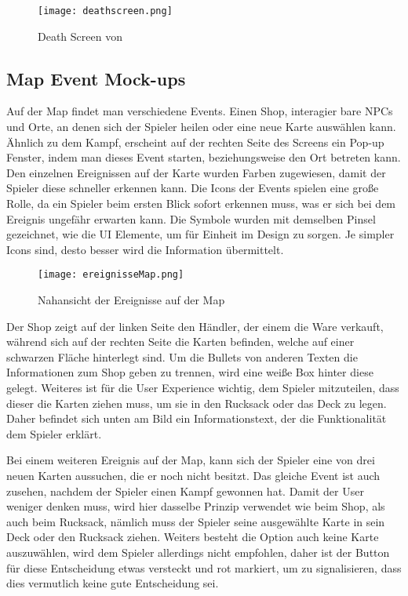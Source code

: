 \begin{figure}[H]
    \centering
    \texttt{[image: deathscreen.png]}
    \caption{Death Screen von \FF}
\end{figure}

\subsection{Map Event Mock-ups}

Auf der Map findet man verschiedene Events. Einen Shop, interagier bare NPCs und Orte, an denen sich der Spieler heilen oder eine neue Karte auswählen kann. Ähnlich zu dem Kampf, erscheint auf der rechten Seite des Screens ein Pop-up Fenster, indem man dieses Event starten, beziehungsweise den Ort betreten kann. Den einzelnen Ereignissen auf der Karte wurden Farben zugewiesen, damit der Spieler diese schneller erkennen kann. Die Icons der Events spielen eine große Rolle, da ein Spieler beim ersten Blick sofort erkennen muss, was er sich bei dem Ereignis ungefähr erwarten kann. Die Symbole wurden mit demselben Pinsel gezeichnet, wie die UI Elemente, um für Einheit im Design zu sorgen. Je simpler Icons sind, desto besser wird die Information übermittelt.

\begin{figure}[H]
    \centering
    \texttt{[image: ereignisseMap.png]}
    \caption{Nahansicht der Ereignisse auf der Map}
\end{figure}

Der Shop zeigt auf der linken Seite den Händler, der einem die Ware verkauft, während sich auf der rechten Seite die Karten befinden, welche auf einer schwarzen Fläche hinterlegt sind. Um die Bullets von anderen Texten die Informationen zum Shop geben zu trennen, wird eine weiße Box hinter diese gelegt. Weiteres ist für die User Experience wichtig, dem Spieler mitzuteilen, dass dieser die Karten ziehen muss, um sie in den Rucksack oder das Deck zu legen. Daher befindet sich unten am Bild ein Informationstext, der die Funktionalität dem Spieler erklärt.

Bei einem weiteren Ereignis auf der Map, kann sich der Spieler eine von drei neuen Karten aussuchen, die er noch nicht besitzt. Das gleiche Event ist auch zusehen, nachdem der Spieler einen Kampf gewonnen hat. Damit der User weniger denken muss, wird hier dasselbe Prinzip verwendet wie beim Shop, als auch beim Rucksack, nämlich muss der Spieler seine ausgewählte Karte in sein Deck oder den Rucksack ziehen. Weiters besteht die Option auch keine Karte auszuwählen, wird dem Spieler allerdings nicht empfohlen, daher ist der Button für diese Entscheidung etwas versteckt und rot markiert, um zu signalisieren, dass dies vermutlich keine gute Entscheidung sei.

